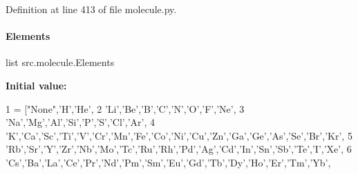 Definition at line 413 of file molecule.\+py.

\mbox{\label{namespacesrc_1_1molecule_a74a6a037671072655c4747c6d3c3173f}} 
\paragraph{\texorpdfstring{Elements}{Elements}}
{\footnotesize\ttfamily list src.\+molecule.\+Elements}

{\bfseries Initial value\+:}
\begin{DoxyCode}
1 =  [\textcolor{stringliteral}{"None"},\textcolor{stringliteral}{'H'},\textcolor{stringliteral}{'He'},
2             \textcolor{stringliteral}{'Li'},\textcolor{stringliteral}{'Be'},\textcolor{stringliteral}{'B'},\textcolor{stringliteral}{'C'},\textcolor{stringliteral}{'N'},\textcolor{stringliteral}{'O'},\textcolor{stringliteral}{'F'},\textcolor{stringliteral}{'Ne'},
3             \textcolor{stringliteral}{'Na'},\textcolor{stringliteral}{'Mg'},\textcolor{stringliteral}{'Al'},\textcolor{stringliteral}{'Si'},\textcolor{stringliteral}{'P'},\textcolor{stringliteral}{'S'},\textcolor{stringliteral}{'Cl'},\textcolor{stringliteral}{'Ar'},
4             \textcolor{stringliteral}{'K'},\textcolor{stringliteral}{'Ca'},\textcolor{stringliteral}{'Sc'},\textcolor{stringliteral}{'Ti'},\textcolor{stringliteral}{'V'},\textcolor{stringliteral}{'Cr'},\textcolor{stringliteral}{'Mn'},\textcolor{stringliteral}{'Fe'},\textcolor{stringliteral}{'Co'},\textcolor{stringliteral}{'Ni'},\textcolor{stringliteral}{'Cu'},\textcolor{stringliteral}{'Zn'},\textcolor{stringliteral}{'Ga'},\textcolor{stringliteral}{'Ge'},\textcolor{stringliteral}{'As'},\textcolor{stringliteral}{'Se'},\textcolor{stringliteral}{'Br'},\textcolor{stringliteral}{'Kr'},
5             \textcolor{stringliteral}{'Rb'},\textcolor{stringliteral}{'Sr'},\textcolor{stringliteral}{'Y'},\textcolor{stringliteral}{'Zr'},\textcolor{stringliteral}{'Nb'},\textcolor{stringliteral}{'Mo'},\textcolor{stringliteral}{'Tc'},\textcolor{stringliteral}{'Ru'},\textcolor{stringliteral}{'Rh'},\textcolor{stringliteral}{'Pd'},\textcolor{stringliteral}{'Ag'},\textcolor{stringliteral}{'Cd'},\textcolor{stringliteral}{'In'},\textcolor{stringliteral}{'Sn'},\textcolor{stringliteral}{'Sb'},\textcolor{stringliteral}{'Te'},\textcolor{stringliteral}{'I'},\textcolor{stringliteral}{'Xe'},
6             \textcolor{stringliteral}{'Cs'},\textcolor{stringliteral}{'Ba'},\textcolor{stringliteral}{'La'},\textcolor{stringliteral}{'Ce'},\textcolor{stringliteral}{'Pr'},\textcolor{stringliteral}{'Nd'},\textcolor{stringliteral}{'Pm'},\textcolor{stringliteral}{'Sm'},\textcolor{stringliteral}{'Eu'},\textcolor{stringliteral}{'Gd'},\textcolor{stringliteral}{'Tb'},\textcolor{stringliteral}{'Dy'},\textcolor{stringliteral}{'Ho'},\textcolor{stringliteral}{'Er'},\textcolor{stringliteral}{'Tm'},\textcolor{stringliteral}{'Yb'},

\end{DoxyCode}
